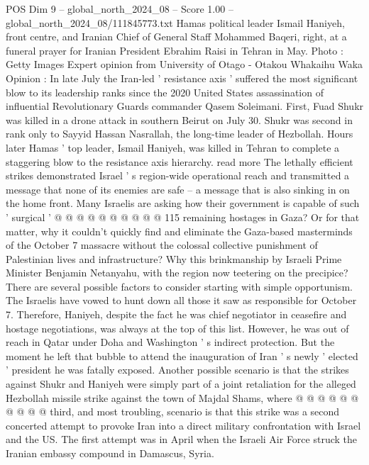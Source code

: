 \begin{textsample}{POS Dim 9 – global\_north\_2024\_08 – Score 1.00 – global\_north\_2024\_08/111845773.txt}  \label{ex:f9_pos_193}
Hamas political leader Ismail Haniyeh, front centre, and Iranian Chief of General Staff Mohammed Baqeri, right, at a funeral prayer for Iranian President Ebrahim Raisi in Tehran in May.
Photo : Getty Images Expert opinion from University of Otago - Otakou Whakaihu Waka Opinion : In late July the Iran-led ' resistance axis ' suffered the most significant blow to its leadership ranks since the 2020 United States assassination of influential Revolutionary Guards commander Qasem Soleimani.
First, Fuad Shukr was killed in a drone attack in southern Beirut on July 30.
Shukr was second in rank only to Sayyid Hassan Nasrallah, the long-time leader of Hezbollah.
Hours later Hamas ' top leader, Ismail Haniyeh, was killed in Tehran to complete a staggering blow to the resistance axis hierarchy. read more The lethally efficient strikes demonstrated Israel ' s region-wide operational reach and transmitted a message that none of its enemies are safe -- a message that is also sinking in on the home front.
Many Israelis are asking how their government is capable of such ' surgical ' @ @ @ @ @ @ @ @ @ @ 115 remaining hostages in Gaza?
Or for that matter, why it couldn't quickly find and eliminate the Gaza-based masterminds of the October 7 massacre without the colossal collective punishment of Palestinian lives and infrastructure?
Why this brinkmanship by Israeli Prime Minister Benjamin Netanyahu, with the region now teetering on the precipice?
There are several possible factors to consider starting with simple opportunism.
The Israelis have vowed to hunt down all those it saw as responsible for October 7.
Therefore, Haniyeh, despite the fact he was chief negotiator in ceasefire and hostage negotiations, was always at the top of this list.
However, he was out of reach in Qatar under Doha and Washington ' s indirect protection.
But the moment he left that bubble to attend the inauguration of Iran ' s newly ' elected ' president he was fatally exposed.
Another possible scenario is that the strikes against Shukr and Haniyeh were simply part of a joint retaliation for the alleged Hezbollah missile strike against the town of Majdal Shams, where @ @ @ @ @ @ @ @ @ @ third, and most troubling, scenario is that this strike was a second concerted attempt to provoke Iran into a direct military confrontation with Israel and the US.
The first attempt was in April when the Israeli Air Force struck the Iranian embassy compound in Damascus, Syria.

\end{textsample}
